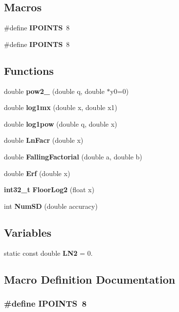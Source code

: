 \subsection*{Macros}
\begin{DoxyCompactItemize}
\item 
\#define {\bf I\-P\-O\-I\-N\-T\-S}~8
\item 
\#define {\bf I\-P\-O\-I\-N\-T\-S}~8
\end{DoxyCompactItemize}
\subsection*{Functions}
\begin{DoxyCompactItemize}
\item 
double {\bf pow2\-\_} (double q, double $\ast$y0=0)
\item 
double {\bf log1mx} (double x, double x1)
\item 
double {\bf log1pow} (double q, double x)
\item 
double {\bf Ln\-Facr} (double x)
\item 
double {\bf Falling\-Factorial} (double a, double b)
\item 
double {\bf Erf} (double x)
\item 
{\bf int32\-\_\-t} {\bf Floor\-Log2} (float x)
\item 
int {\bf Num\-S\-D} (double accuracy)
\end{DoxyCompactItemize}
\subsection*{Variables}
\begin{DoxyCompactItemize}
\item 
static const double {\bf L\-N2} = 0.
\end{DoxyCompactItemize}


\subsection{Macro Definition Documentation}
\subsubsection[{I\-P\-O\-I\-N\-T\-S}]{\setlength{\rightskip}{0pt plus 5cm}\#define I\-P\-O\-I\-N\-T\-S~8}\label{rnd_2wnchyppr_8cpp_adb83927aaa7629e34f6b1c02e258d255}


